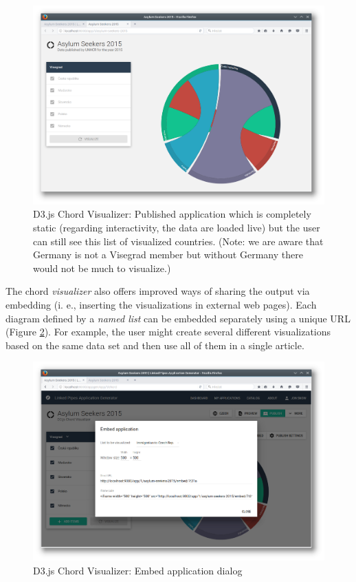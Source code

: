 \begin{figure}
	\centering
	\includegraphics[width=145mm]{img/06_chord_visegrad_published}
	\caption{D3.js Chord Visualizer: Published application which is completely static (regarding interactivity, the data are loaded live) but the user can still see this list of visualized countries. (Note: we are aware that Germany is not a Visegrad member but without Germany there would not be much to visualize.)}
    \label{fig:chord-visegrad-published}
\end{figure}

The chord \emph{visualizer} also offers improved ways of sharing the output via embedding (i. e., inserting the visualizations in external web pages). Each diagram defined by a \emph{named list} can be embedded separately using a unique URL (Figure \ref{fig:chord-embed-configuration}). For example, the user might create several different visualizations based on the same data set and then use all of them in a single article.

\begin{figure}
	\centering
	\includegraphics[width=145mm]{img/06_chord_embed_configuration}
	\caption{D3.js Chord Visualizer: Embed application dialog}
    \label{fig:chord-embed-configuration}
\end{figure}

